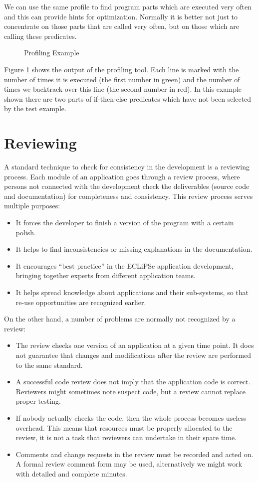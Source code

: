 \documentclass[a4paper,12pt]{report}
\begin{document}
We can use the same profile to find program parts which are executed very often and this can provide hints for optimization. Normally it is better not just to concentrate on those parts that are called very often, but on those which are calling these predicates. 

\begin{figure}[thbp]
\caption{\label{Profiling}Profiling Example}
\end{figure}

Figure \ref{Profiling} shows the output of the profiling tool. Each line is marked with the number of times it is executed (the first number in green) and the number of times we backtrack over this line (the second number in red). In this example shown there are two parts of if-then-else predicates which have not been selected by the test example.

\section{Reviewing}
A standard technique to check for consistency in the development is a reviewing process. Each module of an application goes through a review process, where persons not connected with the development check the deliverables (source code and documentation) for completeness and consistency. This review process serves multiple purposes:
\begin{itemize}
\item It forces the developer to finish a version of the program with a certain polish. 
\item It helps to find inconsistencies or missing explanations in the documentation.
\item It encourages ``best practice'' in the ECLiPSe application development, bringing together experts from different application teams.
\item It helps spread knowledge about applications and their sub-systems, so that re-use opportunities are recognized earlier.
\end{itemize}
On the other hand, a number of problems are normally not recognized by a review:
\begin{itemize}
\item The review checks one version of an application at a given time point. It does not guarantee that changes and modifications after the review are performed to the same standard.
\item A successful code review does not imply that the application code is correct. Reviewers might sometimes note suspect code, but a review cannot replace proper testing.
\item If nobody actually checks the code, then the whole process becomes useless overhead. This means that resources must be properly allocated to the review, it is not a task that reviewers can undertake in their spare time.
\item Comments and change requests in the review must be recorded and acted on. A formal review comment form may be used, alternatively we might work with detailed and complete minutes.
\end{itemize}
\end{document}
